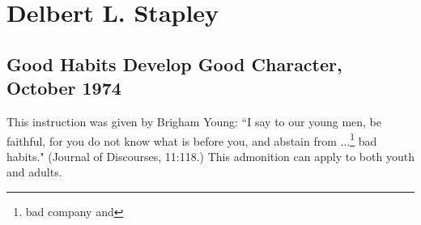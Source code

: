 \section{Delbert L. Stapley}

\subsection{Good Habits Develop Good Character, October 1974}

This instruction was given by Brigham Young: ``I say to our young men, be faithful, for you do not know what is before you, and abstain from ...\footnote{bad company and} bad habits." (Journal of Discourses, 11:118.) This admonition can apply to both youth and adults.